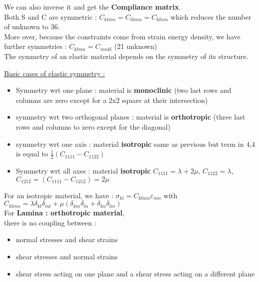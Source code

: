 \documentclass[../main.tex]{subfiles}
\begin{document}
We can also inverse it and get the \textbf{Compliance matrix}.\\

Both S and C are symmetric : $C_{klmn} = C_{lkmn} = C_{klnm}$ which reduces the number of unknown to 36.\\

More over, because the constraints come from strain energy density, we have further symmetries : $C_{klmn} = C_{mnkl}$ (21 unknown)\\

The symmetry of an elastic material depends on the symmetry of its structure.

\quad \underline{Basic cases of elastic symmetry :}\\
\begin{itemize}
    \item Symmetry wrt one plane : material is \textbf{monoclinic} (two last rows and columns are zero except for a 2x2 square at their intersection)\\
    \item symmetry wrt two orthogonal planes : material is \textbf{orthotropic} (three last rows and columns to zero except for the diagonal)\\
    \item symmetry wrt one axis : material \textbf{isotropic} same as previous but term in 4,4 is equal to $\frac{1}{2}(C_{1111} - C_{1122})$\\
    \item Symmetry wrt all axes : material \textbf{isotropic} $C_{1111} = \lambda+2\mu$, $C_{1122} = \lambda$, $C_{1212} = (C_{1111} - C_{1212}) = 2\mu$\\
\end{itemize}

For an isotropic material, we have : $\sigma_{kl} = C_{klmn} \varepsilon_{mn}$ with $C_{klmn} = \lambda\delta_{kl} \delta_{ml} + \mu(\delta_{km} \delta_{ln} + \delta_{kn} \delta_{lm})$\\

For \textbf{Lamina : orthotropic material},\\
there is no coupling between :
\begin{itemize}
    \item normal stresses and shear strains\\
    \item shear stresses and normal strains\\
    \item shear stress acting on one plane and a shear stress acting on a different plane\\
\end{itemize}
\end{document}
